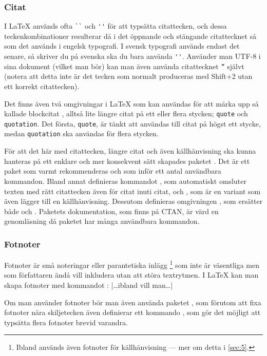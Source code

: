 \documentclass[lang=sv,ptsize=10pt,font=none,nomath,titles=bf,../../a4.tex]{subfiles}
\begin{document}
\subsubsection{Citat}
I \LaTeX{} används ofta \verb|``| och \verb|''| för att typsätta citattecken,
och dessa teckenkombinationer resulterar då i det öppnande och stängande
citattecknet så som det används i engelsk typografi. I svensk typografi
används endast det senare, så skriver du på svenska ska du bara använda
\verb|''|. Använder man UTF-8 i sina dokument (vilket man bör) kan man
även använda citattecknet \verb|”| självt (notera att detta inte är det
tecken som normalt produceras med Shift+2 utan ett korrekt citattecken).

Det finns även två omgivningar i \LaTeX{} som kan användas för att märka upp
så kallade blockcitat , alltså lite längre citat på ett
eller flera stycken; \texttt{quote} och \texttt{quotation}. Det första,
\texttt{quote}, är tänkt att användas till citat på högst ett stycke,
medan \texttt{quotation} ska användas för flera stycken.

För att det här med citattecken, längre citat och även källhänvisning ska
kunna hanteras på ett enklare och mer konsekvent sätt skapades paketet
. Det är ett paket som varmt rekommenderas och som inför
ett antal användbara kommandon. Bland annat definieras kommandot
, som automatiskt omsluter texten med rätt citattecken även
för citat inuti citat, och
, som är en variant som även lägger till en källhänvisning.
Dessutom definieras omgivningen , som ersätter både
 och . Paketets dokumentation, som finns på CTAN,
är värd en genomläsning då paketet har många användbara kommandon.

\subsubsection{Fotnoter}\label{sec:2:footnote}
Fotnoter är små noteringar eller parantetiska inlägg%
\footnote{Ibland används även fotnoter för källhänvisning — mer om detta
i \cref{sec:5}.} som inte är väsentliga men som författaren ändå
vill inkludera utan att störa textrytmen. I \LaTeX{} kan man skapa 
fotnoter med kommandot :
\latex|\ldots{}ibland vill man\ldots|

Om man använder fotnoter bör man även använda paketet , som
förutom att fixa fotnoter nära skiljetecken även definierar ett kommando
, som gör det möjligt att typsätta flera fotnoter brevid
varandra.
\end{document}
